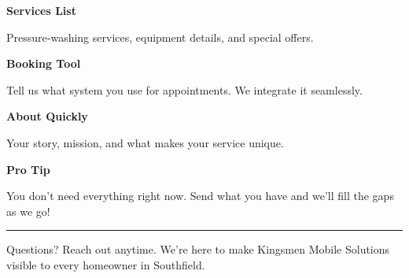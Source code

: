 \documentclass[11pt,letterpaper]{article}
\begin{document}
\hfill
\begin{minipage}[t]{0.48\textwidth}
\begin{tcolorbox}[colframe=accent-teal, boxrule=1pt, left=0.7em, right=0.7em, top=0.5em, bottom=0.5em, arc=4pt, boxsep=0pt]
{\bfseries\small\color{accent-teal}Services List}

\vspace{0.15em}

{\small Pressure‑washing services, equipment details, and special offers.}
\end{tcolorbox}

\vspace{0.1em}

\begin{tcolorbox}[colframe=accent-teal, boxrule=1pt, left=0.7em, right=0.7em, top=0.5em, bottom=0.5em, arc=4pt, boxsep=0pt]
{\bfseries\small\color{accent-teal}Booking Tool}

\vspace{0.15em}

{\small Tell us what system you use for appointments. We integrate it seamlessly.}
\end{tcolorbox}

\vspace{0.1em}

\begin{tcolorbox}[colframe=accent-teal, boxrule=1pt, left=0.7em, right=0.7em, top=0.5em, bottom=0.5em, arc=4pt, boxsep=0pt]
{\bfseries\small\color{accent-teal}About Quickly}

\vspace{0.15em}

{\small Your story, mission, and what makes your service unique.}
\end{tcolorbox}

\vspace{-0.2em}
\end{minipage}

\vspace{0.15em}

\begin{tcolorbox}[colback={accent-red!5}, colframe=accent-red!20, boxrule=0.5pt, left=0.7em, right=0.7em, top=0.4em, bottom=0.4em, arc=6pt, boxsep=0pt]

{\bfseries\small\color{accent-red}Pro Tip}

\vspace{0.1em}

{\small You don't need everything right now. Send what you have and we'll fill the gaps as we go!}

\end{tcolorbox}

\vspace{0.15em}

\noindent\hrule
\vspace{0.2em}

{\small\color{text-light}Questions? Reach out anytime. We're here to make Kingsmen Mobile Solutions visible to every homeowner in Southfield.}
\end{document}
